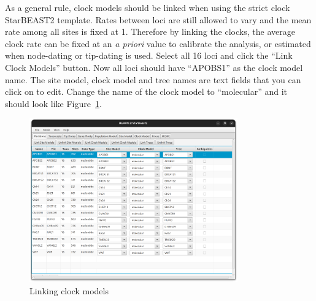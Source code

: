\documentclass[12pt]{article}
\begin{document}
As a general rule, clock models should be linked when using the strict clock StarBEAST2 template. Rates between
loci are still allowed to vary and the mean rate among all sites is fixed at 1. Therefore
by linking the clocks, the average clock rate can be fixed at an \textit{a priori} value
to calibrate the analysis, or estimated when node-dating or tip-dating is used.
Select all 16 loci and click the ``Link Clock Models'' button. Now all loci
should have ``APOBS1'' as the clock model name. The site model, clock model and tree names are text fields that you can click on to edit. Change the name of the clock model to ``molecular'' and it should look like Figure~\ref{fig:linkModels}.

\begin{figure}[htb!]
\centering
\includegraphics[width=0.8\textwidth]{figures/linkModels.png}
\caption
{Linking clock models}
\label{fig:linkModels}
\end{figure}{}
\end{document}
